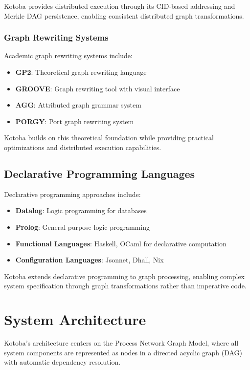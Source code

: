 \documentclass[11pt,a4paper]{article}
\begin{document}
Kotoba provides distributed execution through its CID-based addressing and Merkle DAG persistence, enabling consistent distributed graph transformations.

\subsubsection{Graph Rewriting Systems}
\label{subsubsec:rewriting_systems}

Academic graph rewriting systems include:
\begin{itemize}
\item \textbf{GP2}: Theoretical graph rewriting language
\item \textbf{GROOVE}: Graph rewriting tool with visual interface
\item \textbf{AGG}: Attributed graph grammar system
\item \textbf{PORGY}: Port graph rewriting system
\end{itemize}

Kotoba builds on this theoretical foundation while providing practical optimizations and distributed execution capabilities.

\subsection{Declarative Programming Languages}
\label{subsec:declarative}

Declarative programming approaches include:
\begin{itemize}
\item \textbf{Datalog}: Logic programming for databases
\item \textbf{Prolog}: General-purpose logic programming
\item \textbf{Functional Languages}: Haskell, OCaml for declarative computation
\item \textbf{Configuration Languages}: Jsonnet, Dhall, Nix
\end{itemize}

Kotoba extends declarative programming to graph processing, enabling complex system specification through graph transformations rather than imperative code.

\section{System Architecture}
\label{sec:architecture}

Kotoba's architecture centers on the Process Network Graph Model, where all system components are represented as nodes in a directed acyclic graph (DAG) with automatic dependency resolution.
\end{document}
